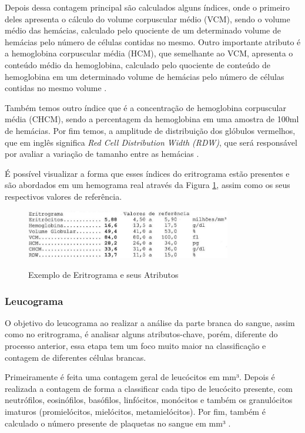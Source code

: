 Depois dessa contagem principal são calculados alguns índices, onde o primeiro deles apresenta o cálculo do volume corpuscular médio (VCM), sendo o volume médio das hemácias, calculado pelo quociente de um determinado volume de hemácias pelo número de células contidas no mesmo. Outro importante atributo é a hemoglobina corpuscular média (HCM), que semelhante ao VCM, apresenta o conteúdo médio da hemoglobina, calculado pelo quociente de conteúdo de hemoglobina em um determinado volume de hemácias pelo número de células contidas no mesmo volume \cite{interpretacaoHemograma, manualHematologia}.

Também temos outro índice que é a concentração de hemoglobina corpuscular média (CHCM), sendo a percentagem da hemoglobina em uma amostra de 100ml de hemácias. Por fim temos, a amplitude de distribuição dos glóbulos vermelhos, que em inglês significa \emph{Red Cell Distribution Width (RDW)}, que será responsável por avaliar a variação de tamanho entre as hemácias \cite{interpretacaoHemograma, manualHematologia}.

É possível visualizar a forma que esses índices do eritrograma estão presentes e são abordados em um hemograma real através da Figura \ref{fig:eritrograma}, assim como os seus respectivos valores de referência.

\begin{figure}[!htb]
	\centering
	\caption{Exemplo de Eritrograma e seus Atributos}
	\includegraphics[width=0.80\textwidth]{img/eritrograma.jpg}
	\label{fig:eritrograma}
\end{figure}
 
\subsubsection{Leucograma}
O objetivo do leucograma ao realizar a análise da parte branca do sangue, assim como no eritrograma, é analisar alguns atributos-chave, porém, diferente do processo anterior, essa etapa tem um foco muito maior na classificação e contagem de diferentes células brancas.

Primeiramente é feita uma contagem geral de leucócitos em mm³. Depois é realizada a contagem de forma a classificar cada tipo de leucócito presente, com neutrófilos, eosinófilos, basófilos, linfócitos, monócitos e também os granulócitos imaturos (promielócitos, mielócitos, metamielócitos). Por fim, também é calculado o número presente de plaquetas no sangue em mm³ \cite{interpretacaoHemograma, manualHematologia}.

